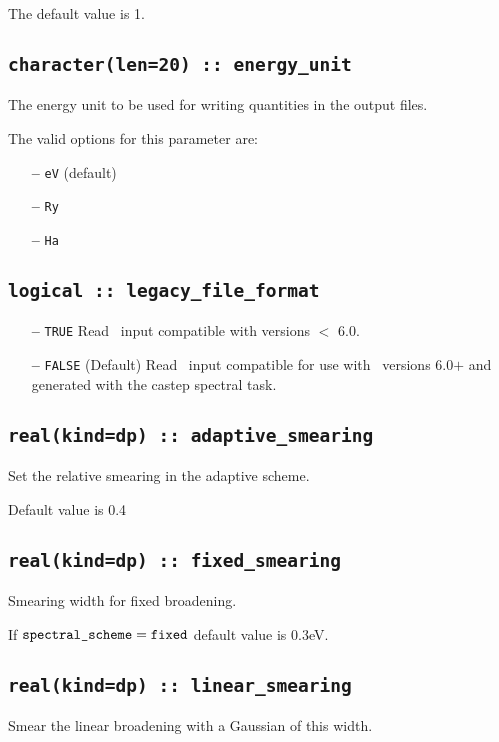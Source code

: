 \documentclass[a4paper,11pt,twoside]{book}
\begin{document}
{The default value is 1.


\subsection[energy\_unit]{\tt character(len=20) :: energy\_unit}
The energy unit to be used for writing quantities in the output files.

The valid options for this parameter are:
\begin{itemize}
\item[{\bf --}]  \verb#eV# (default)
\item[{\bf --}]  \verb#Ry#
\item[{\bf --}]  \verb#Ha#
\end{itemize}

\subsection[adaptive\_smearing]{\tt logical :: legacy\_file\_format}
\label{sect:lff}
\begin{itemize}
\item[{\bf --}] \verb#TRUE#  Read \castep\ input compatible with versions $<$ 6.0.
\item[{\bf --}] \verb#FALSE# (Default) Read \castep\ input compatible for use with \castep\ versions 6.0$+$ and generated with the castep spectral task.
\end{itemize}

\subsection[adaptive\_smearing]{\tt real(kind=dp) :: adaptive\_smearing}
Set the relative smearing in the adaptive scheme.

Default value is 0.4

\subsection[fixed\_smearing]{\tt real(kind=dp) :: fixed\_smearing}
Smearing width for fixed broadening.

If $\verb#spectral_scheme# = \verb#fixed#$ default value is 0.3eV.


\subsection[adaptive\_smearing]{\tt real(kind=dp) :: linear\_smearing}
Smear the linear broadening with a Gaussian of this width.

}
\end{document}
